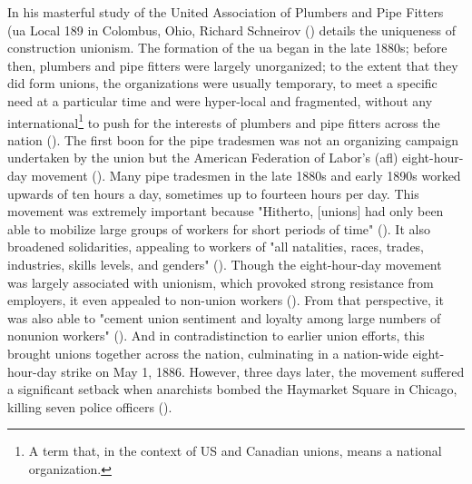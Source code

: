 \documentclass[12pt]{article}
\begin{document}
In his masterful study of the United Association of Plumbers and Pipe Fitters (\acrshort{ua} Local 189 in Colombus, Ohio, Richard Schneirov (\citeyear{schneirovPrideSolidarityHistory1993}) details the uniqueness of construction unionism. The formation of the \acrshort{ua} began in the late 1880s; before then, plumbers and pipe fitters were largely unorganized; to the extent that they did form unions, the organizations were usually temporary, to meet a specific need at a particular time and were hyper-local and fragmented, without any international\footnote{A term that, in the context of US and Canadian unions, means a national organization.} to push for the interests of plumbers and pipe fitters across the nation (\citeyear[58]{schneirovPrideSolidarityHistory1993}). The first boon for the pipe tradesmen was not an organizing campaign undertaken by the union but the American Federation of Labor’s (\acrshort{afl}) eight-hour-day movement (\citeyear[11, 43–45]{schneirovPrideSolidarityHistory1993}). Many pipe tradesmen in the late 1880s and early 1890s worked upwards of ten hours a day, sometimes up to fourteen hours per day. This movement was extremely important because "Hitherto, [unions] had only been able to mobilize large groups of workers for short periods of time" (\citeyear[43–45]{schneirovPrideSolidarityHistory1993}). It also broadened solidarities, appealing to workers of "all natalities, races, trades, industries, skills levels, and genders" (\citeyear[43]{schneirovPrideSolidarityHistory1993}). Though the eight-hour-day movement was largely associated with unionism, which provoked strong resistance from employers, it even appealed to non-union workers (\citeyear[45]{schneirovPrideSolidarityHistory1993}). From that perspective, it was also able to "cement union sentiment and loyalty among large numbers of nonunion workers" (\citeyear[45]{schneirovPrideSolidarityHistory1993}). And in contradistinction to earlier union efforts, this brought unions together across the nation, culminating in a nation-wide eight-hour-day strike on May 1, 1886. However, three days later, the movement suffered a significant setback when anarchists bombed the Haymarket Square in Chicago, killing seven police officers (\citeyear[45]{schneirovPrideSolidarityHistory1993}).
\end{document}
